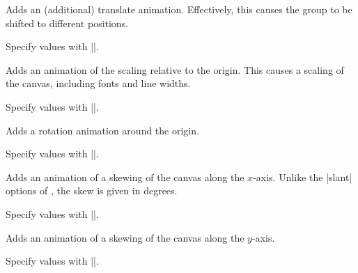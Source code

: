 \begin{command}{\pgfsys@animatetranslate}
  Adds an (additional) translate animation. Effectively, this causes
  the group to be shifted to different positions.
  
  Specify values with |\pgfsys@animation@val@translate|. 
\begin{codeexample}[width=2cm]
\end{codeexample}
\end{command}

\begin{command}{\pgfsys@animatescale}
  Adds an animation of the scaling relative to the origin. This causes
  a scaling of the canvas, including fonts and line widths.
  
  Specify values with |\pgfsys@animation@val@scale|.
\begin{codeexample}[width=2cm]
\end{codeexample}
\end{command}

\begin{command}{\pgfsys@animaterotate}
  Adds a rotation animation around the origin.
  
  Specify values with |\pgfsys@animation@val@scalar|.
\begin{codeexample}[width=2cm]
\end{codeexample}
\end{command}

\begin{command}{\pgfsys@animateskewx}
  Adds an animation of a skewing of the canvas along the
  $x$-axis. Unlike the |slant| options of \tikzname, the skew is given
  in degrees.
  
  Specify values with |\pgfsys@animation@val@scalar|.
\begin{codeexample}[width=2cm]
\end{codeexample}
\end{command}

\begin{command}{\pgfsys@animateskewy}
  Adds an animation of a skewing of the canvas along the $y$-axis.
  
  Specify values with |\pgfsys@animation@val@scalar|.
\end{command}

